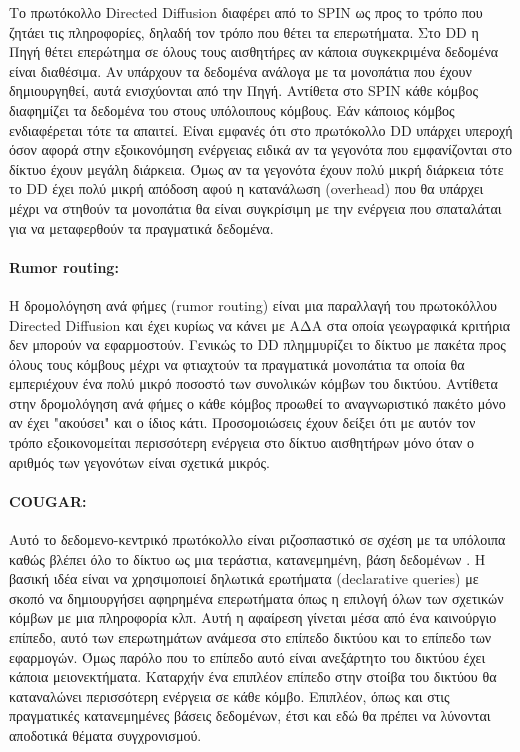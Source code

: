 Το πρωτόκολλο Directed Diffusion διαφέρει από το SPIN ως προς το τρόπο που ζητάει τις πληροφορίες, δηλαδή τον τρόπο που θέτει τα επερωτήματα. Στο DD η Πηγή θέτει
επερώτημα σε όλους τους αισθητήρες αν κάποια συγκεκριμένα δεδομένα είναι διαθέσιμα. Αν υπάρχουν τα δεδομένα ανάλογα με τα μονοπάτια που έχουν δημιουργηθεί, αυτά
ενισχύονται από την Πηγή. Αντίθετα στο SPIN κάθε κόμβος διαφημίζει τα δεδομένα του στους υπόλοιπους κόμβους. Εάν κάποιος κόμβος ενδιαφέρεται τότε τα απαιτεί. Είναι
εμφανές ότι στο πρωτόκολλο DD υπάρχει υπεροχή όσον αφορά στην εξοικονόμηση ενέργειας ειδικά αν τα γεγονότα που εμφανίζονται στο δίκτυο έχουν μεγάλη διάρκεια. Όμως αν
τα γεγονότα έχουν πολύ μικρή διάρκεια τότε το DD έχει πολύ μικρή απόδοση αφού η κατανάλωση (overhead) που θα υπάρχει μέχρι να στηθούν τα μονοπάτια θα είναι
συγκρίσιμη με την ενέργεια που σπαταλάται για να μεταφερθούν τα πραγματικά δεδομένα.

\paragraph{Rumor routing:} Η δρομολόγηση ανά φήμες (rumor routing) \cite{rumor_routing} είναι μια παραλλαγή του πρωτοκόλλου Directed Diffusion και έχει κυρίως να
κάνει
με ΑΔΑ στα οποία γεωγραφικά κριτήρια δεν μπορούν να εφαρμοστούν. Γενικώς το DD πλημμυρίζει το δίκτυο με πακέτα προς όλους τους κόμβους μέχρι να φτιαχτούν τα
πραγματικά μονοπάτια τα οποία θα εμπεριέχουν ένα πολύ μικρό ποσοστό των συνολικών κόμβων του δικτύου. Αντίθετα στην δρομολόγηση ανά φήμες ο κάθε κόμβος προωθεί το
αναγνωριστικό πακέτο μόνο αν έχει "ακούσει" και ο ίδιος κάτι. Προσομοιώσεις έχουν δείξει ότι με αυτόν τον τρόπο εξοικονομείται περισσότερη ενέργεια στο δίκτυο
αισθητήρων μόνο όταν ο αριθμός των γεγονότων είναι σχετικά μικρός.

\paragraph{COUGAR:} Αυτό το δεδομενο-κεντρικό πρωτόκολλο είναι ριζοσπαστικό σε σχέση με τα υπόλοιπα καθώς βλέπει όλο το δίκτυο ως μια τεράστια, κατανεμημένη, βάση
δεδομένων \cite{cougar_protocol}. Η βασική ιδέα είναι να χρησιμοποιεί δηλωτικά ερωτήματα (declarative queries) με σκοπό να δημιουργήσει αφηρημένα επερωτήματα όπως η
επιλογή όλων των σχετικών κόμβων με μια πληροφορία κλπ. Αυτή η αφαίρεση γίνεται μέσα από ένα καινούργιο επίπεδο, αυτό των επερωτημάτων ανάμεσα στο επίπεδο δικτύου και
το επίπεδο των εφαρμογών. Όμως παρόλο που το επίπεδο αυτό είναι ανεξάρτητο του δικτύου έχει κάποια μειονεκτήματα. Καταρχήν ένα επιπλέον επίπεδο στην στοίβα του
δικτύου θα καταναλώνει περισσότερη ενέργεια σε κάθε κόμβο. Επιπλέον, όπως και στις πραγματικές κατανεμημένες βάσεις δεδομένων, έτσι και εδώ θα πρέπει να λύνονται
αποδοτικά θέματα συγχρονισμού.

